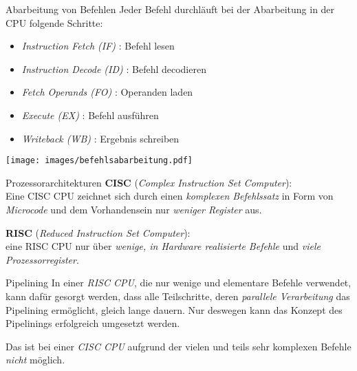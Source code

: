 \documentclass[german]{../spicker}
\begin{document}
\begin{bonus}{Abarbeitung von Befehlen}
    Jeder Befehl durchläuft bei der Abarbeitung in der CPU folgende Schritte:
    \begin{itemize}
        \item \emph{Instruction Fetch (IF)} : Befehl lesen
        \item \emph{Instruction Decode (ID)} : Befehl decodieren
        \item \emph{Fetch Operands (FO)} : Operanden laden
        \item \emph{Execute (EX)} : Befehl ausführen
        \item \emph{Writeback (WB)} : Ergebnis schreiben
    \end{itemize}

    \begin{center}
        \texttt{[image: images/befehlsabarbeitung.pdf]}
    \end{center}
\end{bonus}

\begin{defi}{Prozessorarchitekturen}
    \textbf{CISC} (\emph{Complex Instruction Set Computer}):\\
    Eine CISC CPU zeichnet sich durch einen \emph{komplexen Befehlssatz} in Form von \emph{Microcode} und dem Vorhandensein nur \emph{weniger Register} aus.

    \textbf{RISC} (\emph{Reduced Instruction Set Computer}):\\
    eine RISC CPU nur über \emph{wenige, in Hardware realisierte Befehle} und \emph{viele Prozessorregister}.
\end{defi}

\begin{defi}{Pipelining}
    In einer \emph{RISC CPU}, die nur wenige und elementare Befehle verwendet, kann dafür
    gesorgt werden, dass alle Teilschritte, deren \emph{parallele Verarbeitung} das Pipelining
    ermöglicht, gleich lange dauern. Nur deswegen kann das Konzept des Pipelinings
    erfolgreich umgesetzt werden.

    Das ist bei einer \emph{CISC CPU} aufgrund der vielen
    und teils sehr komplexen Befehle \emph{nicht} möglich.
\end{defi}
\end{document}
